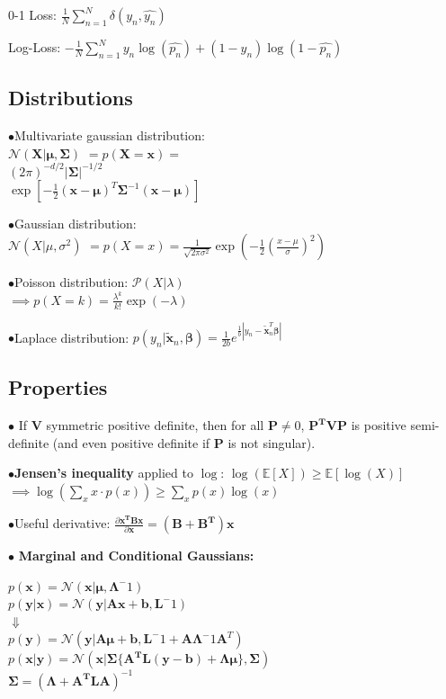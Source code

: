 \documentclass[10pt,a4paper,landscape]{article}
\renewcommand{\bf}[1]{\ensuremath{\mathbf{#1}}}
\begin{document}
\begin{multicols*}{6}
0-1 Loss: $ \frac{1}{N} \sum_{n=1}^{N} \delta(y_n, \hat{y_n})$

Log-Loss: $- \frac{1}{N}  \sum_{n=1}^{N} y_n \log(\hat{p_n}) + (1-y_n) \log(1-\hat{p_n})$

\subsection{Distributions}
$\bullet$Multivariate gaussian distribution:\\
 $\mathcal{N}(\bf{X} | \bf{\mu} , \bf{\Sigma})$ 
$= p(\bf{X} = \bf{x}) =$\\
$(2 \pi)^{-d/2} |\bf{\Sigma|}^{-1/2}$\\
$ \exp{[- \frac{1}{2} (\bf{x} - \bf{\mu})^T \bf{\Sigma}^{-1} (\bf{x} - \bf{\mu})]}$

$\bullet$Gaussian distribution: \\
$\mathcal{N}(X| \mu, \sigma^2)$ 
$= p(X = x) = \frac{1}{\sqrt{2 \pi \sigma^2}} \exp{(- \frac{1}{2} ( \frac{x - \mu}{\sigma} )^2)}$

$\bullet$Poisson distribution: $\mathcal{P}(X| \lambda)$ \\
$\implies p(X = k) = \frac{\lambda ^ k}{k!} \exp{(- \lambda)}$

$\bullet$Laplace distribution: $p(y_n|\tilde{\bf{x}}_n,\boldsymbol\beta)=\frac{1}{2b}e^{\frac{1}{b}|y_n-\tilde{\bf{x}}_n^T\boldsymbol\beta|}$

\subsection{Properties}
$\bullet$ If $\bf{V}$ symmetric positive definite, then for all $\bf{P} \neq 0$, $\bf{P^T V P}$ is positive semi-definite (and even positive definite if $\bf{P}$ is not singular).

$\bullet$\textbf{Jensen's inequality} applied to $\log$: $\log( \mathbb{E}[X] ) \geq \mathbb{E}[\log(X)]$ \\
$\implies \log ( \sum_x x \cdot p(x) ) \geq \sum_x p(x) \log(x)$


$\bullet$Useful derivative: $\frac{\partial \bf{x^T B x}}{\partial \bf{x}} = (\bf{B + B^T}) \bf{x}$

$\bullet$ \textbf{Marginal and Conditional Gaussians:}

$p(\bf{x}) = \mathcal{N}(\bf{x} | \boldsymbol\mu, \boldsymbol\Lambda^-1) $\\
$p(\bf{y}|\bf{x}) = \mathcal{N}(\bf{y} | \bf{Ax + b, L}^-1)$ \\
$\Downarrow$ \\
$p(\bf{y}) = \mathcal{N}(\bf{y} | \bf{A} \boldsymbol\mu + \bf{b}, \bf{L}^-1 + \bf{A} \boldsymbol\Lambda^-1 \bf{A}^T)$	\\
$p(\bf{x}|\bf{y}) = \mathcal{N}(\bf{x} |\boldsymbol\Sigma \{ \bf{A^T L(y - b) + \Lambda \mu} \}, \boldsymbol\Sigma)$ \\
 $\boldsymbol\Sigma = (\boldsymbol\Lambda + \bf{A^T L A})^{-1}$


\end{multicols*}
\end{document}
